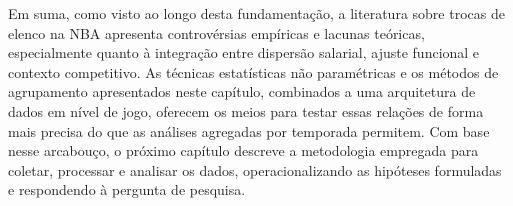 \vspace{1em} %

Em suma, como visto ao longo desta fundamentação, a literatura sobre trocas de elenco na NBA apresenta controvérsias empíricas e lacunas teóricas, especialmente quanto à integração entre dispersão salarial, ajuste funcional e contexto competitivo. As técnicas estatísticas não paramétricas e os métodos de agrupamento apresentados neste capítulo, combinados a uma arquitetura de dados em nível de jogo, oferecem os meios para testar essas relações de forma mais precisa do que as análises agregadas por temporada permitem. Com base nesse arcabouço, o próximo capítulo descreve a metodologia empregada para coletar, processar e analisar os dados, operacionalizando as hipóteses formuladas e respondendo à pergunta de pesquisa.
